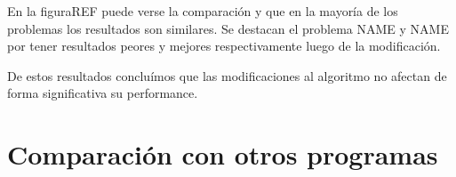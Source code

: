 En la figura{REF} puede verse la comparación y que en la mayoría de los problemas los resultados son similares. Se destacan el problema {NAME} y {NAME} por tener resultados peores y mejores respectivamente luego de la modificación.

De estos resultados concluímos que las modificaciones al algoritmo no afectan de forma significativa su performance.

\section{Comparación con otros programas}











